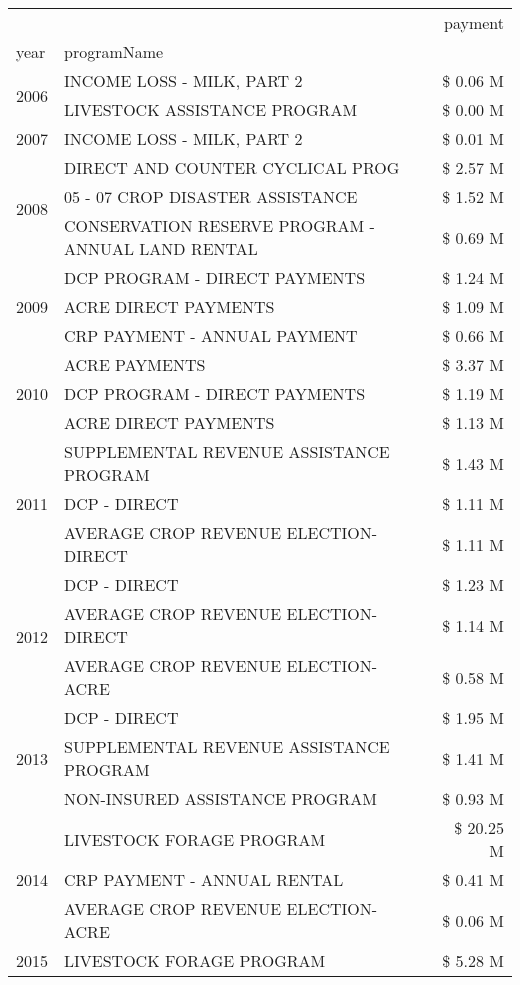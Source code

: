 \begin{tabular}{llr}
\toprule
 &  & payment \\
year & programName &  \\
\midrule
\multirow[t]{2}{*}{2006} & INCOME LOSS - MILK, PART 2 & \$ 0.06 M \\
 & LIVESTOCK ASSISTANCE PROGRAM & \$ 0.00 M \\
\cline{1-3}
2007 & INCOME LOSS - MILK, PART 2 & \$ 0.01 M \\
\cline{1-3}
\multirow[t]{3}{*}{2008} & DIRECT AND COUNTER CYCLICAL PROG & \$ 2.57 M \\
 & 05 - 07 CROP DISASTER ASSISTANCE & \$ 1.52 M \\
 & CONSERVATION RESERVE PROGRAM - ANNUAL LAND RENTAL & \$ 0.69 M \\
\cline{1-3}
\multirow[t]{3}{*}{2009} & DCP PROGRAM - DIRECT PAYMENTS & \$ 1.24 M \\
 & ACRE DIRECT PAYMENTS & \$ 1.09 M \\
 & CRP PAYMENT - ANNUAL PAYMENT & \$ 0.66 M \\
\cline{1-3}
\multirow[t]{3}{*}{2010} & ACRE PAYMENTS & \$ 3.37 M \\
 & DCP PROGRAM - DIRECT PAYMENTS & \$ 1.19 M \\
 & ACRE DIRECT PAYMENTS & \$ 1.13 M \\
\cline{1-3}
\multirow[t]{3}{*}{2011} & SUPPLEMENTAL REVENUE ASSISTANCE PROGRAM & \$ 1.43 M \\
 & DCP - DIRECT & \$ 1.11 M \\
 & AVERAGE CROP REVENUE ELECTION-DIRECT & \$ 1.11 M \\
\cline{1-3}
\multirow[t]{3}{*}{2012} & DCP - DIRECT & \$ 1.23 M \\
 & AVERAGE CROP REVENUE ELECTION-DIRECT & \$ 1.14 M \\
 & AVERAGE CROP REVENUE ELECTION-ACRE & \$ 0.58 M \\
\cline{1-3}
\multirow[t]{3}{*}{2013} & DCP - DIRECT & \$ 1.95 M \\
 & SUPPLEMENTAL REVENUE ASSISTANCE PROGRAM & \$ 1.41 M \\
 & NON-INSURED ASSISTANCE PROGRAM & \$ 0.93 M \\
\cline{1-3}
\multirow[t]{3}{*}{2014} & LIVESTOCK FORAGE PROGRAM & \$ 20.25 M \\
 & CRP PAYMENT - ANNUAL RENTAL & \$ 0.41 M \\
 & AVERAGE CROP REVENUE ELECTION-ACRE & \$ 0.06 M \\
\cline{1-3}
\multirow[t]{3}{*}{2015} & LIVESTOCK FORAGE PROGRAM & \$ 5.28 M \\

\end{tabular}
